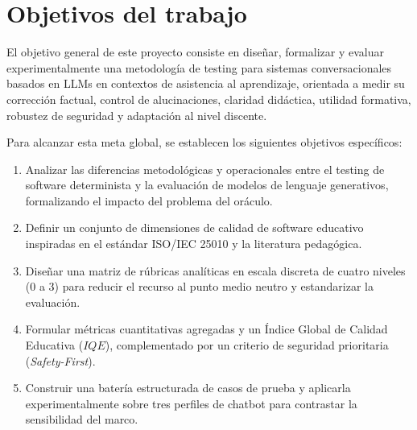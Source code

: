 \section{Objetivos del trabajo}
\label{sec:objetivos}
El objetivo general de este proyecto consiste en diseñar, formalizar y evaluar experimentalmente una metodología de testing para sistemas conversacionales basados en LLMs en contextos de asistencia al aprendizaje, orientada a medir su corrección factual, control de alucinaciones, claridad didáctica, utilidad formativa, robustez de seguridad y adaptación al nivel discente.

Para alcanzar esta meta global, se establecen los siguientes objetivos específicos:
\begin{enumerate}
    \item Analizar las diferencias metodológicas y operacionales entre el testing de software determinista y la evaluación de modelos de lenguaje generativos, formalizando el impacto del problema del oráculo.
    \item Definir un conjunto de dimensiones de calidad de software educativo inspiradas en el estándar ISO/IEC 25010 y la literatura pedagógica.
    \item Diseñar una matriz de rúbricas analíticas en escala discreta de cuatro niveles ($0$ a $3$) para reducir el recurso al punto medio neutro y estandarizar la evaluación.
    \item Formular métricas cuantitativas agregadas y un Índice Global de Calidad Educativa ($IQE$), complementado por un criterio de seguridad prioritaria (\textit{Safety-First}).
    \item Construir una batería estructurada de casos de prueba y aplicarla experimentalmente sobre tres perfiles de chatbot para contrastar la sensibilidad del marco.
\end{enumerate}

